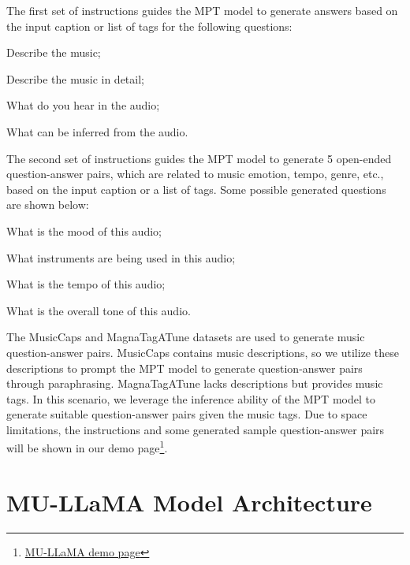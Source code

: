 \documentclass{article}
\begin{document}
The first set of instructions guides the MPT model to generate answers based on the input caption or list of tags for the following questions:
\begingroup
\renewcommand\labelenumi{\textbf{\theenumi.}}
\begin{enumerate*}
    \setlength{\itemsep}{1mm}
    \item Describe the music;
    \item Describe the music in detail;
    \item What do you hear in the audio;
    \item What can be inferred from the audio.
\end{enumerate*}
\endgroup
The second set of instructions guides the MPT model to generate 5 open-ended question-answer pairs, which are related to music emotion, tempo, genre, etc., based on the input caption or a list of tags. Some possible generated questions are shown below:
\begingroup
\renewcommand\labelenumi{\textbf{\theenumi.}}
\begin{enumerate*}
    \setlength{\itemsep}{1mm}
    \item What is the mood of this audio;
    \item What instruments are being used in this audio;
    \item What is the tempo of this audio;
    \item What is the overall tone of this audio.
\end{enumerate*}
\endgroup
The MusicCaps\cite{agostinelli2023musiclm} and MagnaTagATune\cite{9aed49b956a24e99b044582665fd5b21} datasets are used to generate music question-answer pairs. MusicCaps contains music descriptions, so we utilize these descriptions to prompt the MPT model to generate question-answer pairs through paraphrasing. MagnaTagATune lacks descriptions but provides music tags. In this scenario, we leverage the inference ability of the MPT model to generate suitable question-answer pairs given the music tags. Due to space limitations, the instructions and some generated sample question-answer pairs will be shown in our demo page\footnote{\href{https://crypto-code.github.io/MU-LLaMA-Demo/}{MU-LLaMA demo page}}.

\vspace{-0.3cm}
\section{MU-LLaMA Model Architecture}
\label{sec:mu-llama}
\vspace{-0.2cm}
\end{document}
